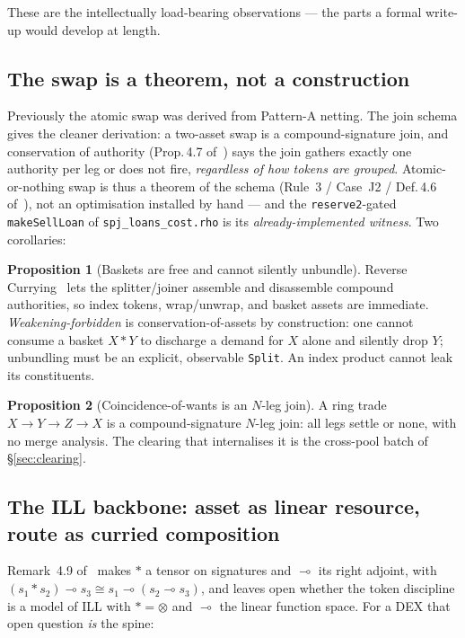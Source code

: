\documentclass[11pt]{article}
\theoremstyle{definition}
\newtheorem{proposition}{Proposition}
\newcommand{\tensorsig}{\ensuremath{\ast}}
\newcommand{\lolli}{\ensuremath{\multimap}}
\begin{document}
These are the intellectually load-bearing observations --- the parts a formal write-up would develop at
length.

\subsection{The swap is a theorem, not a construction}\label{sec:swap}

Previously the atomic swap was derived from Pattern-A netting. The join schema gives the cleaner
derivation: a two-asset swap is a compound-signature join, and conservation of authority
(Prop.\,4.7 of~\cite{cost}) says the join gathers exactly one authority per leg or does not fire,
\emph{regardless of how tokens are grouped}. Atomic-or-nothing swap is thus a theorem of the schema
(Rule~3 / Case~J2 / Def.\,4.6 of~\cite{cost}), not an optimisation installed by hand --- and the
\texttt{reserve2}-gated \texttt{makeSellLoan} of \texttt{spj\_loans\_cost.rho} is its
\emph{already-implemented witness}. Two corollaries:

\begin{proposition}[Baskets are free and cannot silently unbundle]\label{prop:basket}
Reverse Currying~\cite[\S4.8.4]{cost} lets the splitter/joiner assemble and disassemble compound
authorities, so index tokens, wrap/unwrap, and basket assets are immediate. \emph{Weakening-forbidden}
\cite[\S4.8.5]{cost} is conservation-of-assets by construction: one cannot consume a basket
$X \tensorsig Y$ to discharge a demand for $X$ alone and silently drop $Y$; unbundling must be an
explicit, observable \texttt{Split}. An index product cannot leak its constituents.
\end{proposition}

\begin{proposition}[Coincidence-of-wants is an $N$-leg join]\label{prop:cow}
A ring trade $X \to Y \to Z \to X$ is a compound-signature $N$-leg join: all legs settle or none, with
no merge analysis. The clearing that internalises it is the cross-pool batch of \S\ref{sec:clearing}.
\end{proposition}

\subsection{The ILL backbone: asset as linear resource, route as curried composition}\label{sec:ill}

Remark~4.9 of~\cite{cost} makes $\tensorsig$ a tensor on signatures and $\lolli$ its right adjoint,
with $(s_1 \tensorsig s_2) \lolli s_3 \cong s_1 \lolli (s_2 \lolli s_3)$, and leaves open whether the
token discipline is a model of ILL with $\tensorsig = \otimes$ and $\lolli$ the linear function space.
For a DEX that open question \emph{is} the spine:
\end{document}
